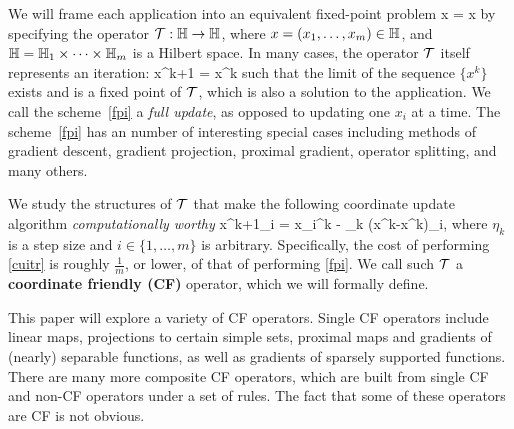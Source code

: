 We will frame each application into an equivalent fixed-point problem
\beq\label{fpprob}
x = \cT x
\eeq
by specifying the operator  ${\mathcal{T}}:\mathbb{H} \to \mathbb{H}$, where $x=(x_1,\ldots,x_m)\in \mathbb{H}$, and $\mathbb{H}=\mathbb{H}_1\times \cdots \times \mathbb{H}_m$ is a Hilbert space. 
In many cases, the operator ${\mathcal{T}}$ itself represents an iteration:
\beq\label{fpi}
x^{k+1} = \cT x^k
\eeq
such that the limit of the sequence $\{x^k\}$  exists and is a fixed point of ${\mathcal{T}}$, which is also a solution to the application. We call the scheme~\eqref{fpi} a \emph{full update}, as opposed to updating one $x_i$ at a time. The  scheme~\eqref{fpi} has an number of interesting special cases including  methods of gradient descent, gradient projection, proximal gradient,  operator splitting, and many others.

We study the structures of ${\mathcal{T}}$ that make the  following coordinate update algorithm \emph{computationally worthy}
\beq\label{cuitr}
x^{k+1}_i = x_i^k - \eta_k (x^k-\cT x^k)_i,
\eeq
where  $\eta_k$ is a  step size and $i\in\{1,\ldots,m\}$ is arbitrary. Specifically, the cost of performing  \eqref{cuitr}  is roughly $\frac{1}{m}$, or lower, of that of performing \eqref{fpi}. We call such ${\mathcal{T}}$ a \textbf{coordinate friendly (CF)} operator, which we will formally define.

This paper will explore a variety of CF operators. Single CF operators include linear maps, projections to certain simple sets, proximal maps and gradients of (nearly) separable functions, as well as gradients of sparsely supported functions. There are many more composite CF operators, which are built from single CF and non-CF operators under a set of rules.  The fact that some of these operators are CF is not obvious.  

